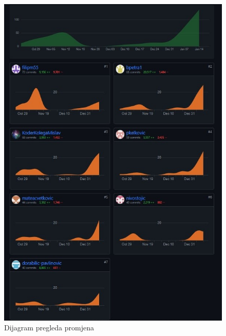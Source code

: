 		\begin{figure}[H]
			\includegraphics[scale=0.5]{slike/aktivnost2}
			\centering
			\caption{Dijagram pregleda promjena}
			\label{fig:BuildComand}
		\end{figure}	
		
	